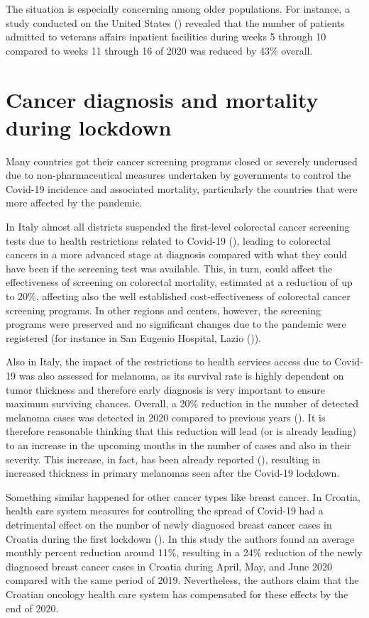 \documentclass[main.tex]{subfiles}
\begin{document}
The situation is especially concerning among older populations. For instance, a study conducted on the United States (\cite{baum_admissions_2020}) revealed that the number of patients admitted to veterans affairs inpatient facilities during weeks 5 through 10 compared to weeks 11 through 16 of 2020 was reduced by 43\% overall.

\section{Cancer diagnosis and mortality during lockdown}\label{sec:cancer}
Many countries got their cancer screening programs closed or severely underused due to non-pharmaceutical measures undertaken by governments to control the Covid-19 incidence and associated mortality, particularly the countries that were more affected by the pandemic. 

In Italy almost all districts suspended the first-level colorectal cancer screening tests due to health restrictions related to Covid-19 (\cite{del_vecchio_blanco_impact_2020}), leading to colorectal cancers in a more advanced stage at diagnosis compared with what they could have been if the screening test was available. This, in turn, could affect the effectiveness of screening on colorectal mortality, estimated at a reduction of up to 20\%, affecting also the well established cost-effectiveness of colorectal cancer screening programs. In other regions and centers, however, the screening programs were preserved and no significant changes due to the pandemic were registered (for instance in San Eugenio Hospital, Lazio (\cite{dovidio_impact_2021})).

Also in Italy, the impact of the restrictions to health services access due to Covid-19 was also assessed for melanoma, as its survival rate is highly dependent on tumor thickness and therefore early diagnosis is very important to ensure maximum surviving chances. Overall, a 20\% reduction in the number of detected melanoma cases was detected in 2020 compared to previous years (\cite{gualdi_effect_2021}). It is therefore reasonable thinking that this reduction will lead (or is already leading) to an increase in the upcoming months in the number of cases and also in their severity. This increase, in fact, has been already reported (\cite{ricci_delayed_2020}), resulting in increased thickness in primary melanomas seen after the Covid-19 lockdown.

Something similar happened for other cancer types like breast cancer. In Croatia, health care system measures for controlling the spread of Covid-19 had a detrimental effect on the number of newly diagnosed breast cancer cases in Croatia during the first lockdown (\cite{vrdoljak_covid-19_2021}). In this study the authors found an average monthly percent reduction around 11\%, resulting in a 24\% reduction of the newly diagnosed breast cancer cases in Croatia during April, May, and June 2020 compared with the same period of 2019. Nevertheless, the authors claim that the Croatian oncology health care system has compensated for these effects by the end of 2020.
\end{document}
